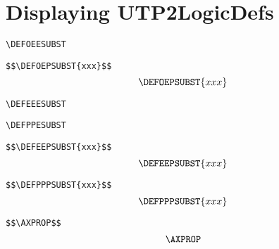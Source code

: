 \section{Displaying UTP2LogicDefs}


\verb"\DEFOEESUBST"
\DEFOEESUBST

\newpage
\verb"$$\DEFOEPSUBST{xxx}$$"
$$\DEFOEPSUBST{xxx}$$


\verb"\DEFEEESUBST"
\DEFEEESUBST

\verb"\DEFPPESUBST"
\DEFPPESUBST


\newpage
\verb"$$\DEFEEPSUBST{xxx}$$"
$$\DEFEEPSUBST{xxx}$$


\newpage
\verb"$$\DEFPPPSUBST{xxx}$$"
$$\DEFPPPSUBST{xxx}$$

%
%
%
%
%
%
%
%
%
%
%

\newpage
\verb"$$\AXPROP$$"
$$\AXPROP$$

